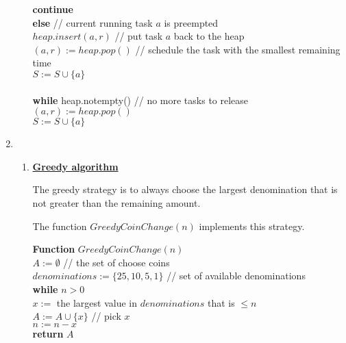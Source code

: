 \documentclass[11pt]{article}
\begin{document}
\begin{enumerate}
\begin{enumerate}
\-\hspace{8em} \textbf{continue}\\
\-\hspace{6em} \textbf{else} // current running task $a$ is preempted\\
\-\hspace{8em} $heap.insert(a,r)$ // put task $a$ back to the heap\\
\-\hspace{8em} $(a,r) := heap.pop()$ // schedule the task with the
smallest remaining time\\
\-\hspace{8em} $S := S \cup \{a\}$\\\\
\-\hspace{2em} \textbf{while} heap.notempty() // no more tasks to
release\\
\-\hspace{4em} $(a,r) := heap.pop()$\\
\-\hspace{4em} $S := S \cup \{a\}$\\

\end{enumerate}

\item %
\begin{enumerate}
\item \underline{\textbf{Greedy algorithm}}

The greedy strategy is to always choose the largest denomination that
is not greater than the remaining amount.

The function $GreedyCoinChange(n)$ implements this strategy.

\textbf{Function} $GreedyCoinChange(n)$\\
\-\hspace{3em} $A := \emptyset$ // the set of choose coins \\
\-\hspace{3em} $denominations := \{25,10,5,1\}$ // set of
available denominations \\
\-\hspace{3em} \textbf{while} $n > 0$\\
\-\hspace{5em} $x := $ the largest value in $denominations$ that is
$\leq n$ \\
\-\hspace{5em} $A := A \cup \{x\}$ // pick $x$\\
\-\hspace{5em} $n := n - x$\\
\-\hspace{3em} \textbf{return} $A$\\


\end{enumerate}
\end{enumerate}
\end{document}
